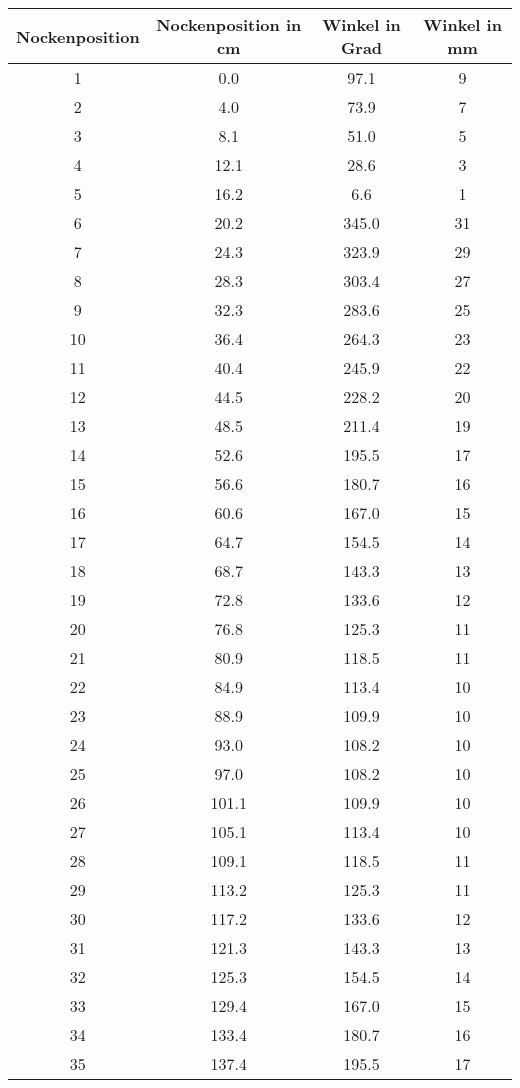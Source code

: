\documentclass[10pt, a4paper]{article}
\begin{document}
\begin{center}
	\begin{tabular}{c|c|c|c}
		Nockenposition & Nockenposition in cm & Winkel in Grad & Winkel in mm \\
		\hline
		1 & 0.0 & 97.1 & 9 \\
		2 & 4.0 & 73.9 & 7 \\
		3 & 8.1 & 51.0 & 5 \\
		4 & 12.1 & 28.6 & 3 \\
		5 & 16.2 & 6.6 & 1 \\
		6 & 20.2 & 345.0 & 31 \\
		7 & 24.3 & 323.9 & 29 \\
		8 & 28.3 & 303.4 & 27 \\
		9 & 32.3 & 283.6 & 25 \\
		10 & 36.4 & 264.3 & 23 \\
		11 & 40.4 & 245.9 & 22 \\
		12 & 44.5 & 228.2 & 20 \\
		13 & 48.5 & 211.4 & 19 \\
		14 & 52.6 & 195.5 & 17 \\
		15 & 56.6 & 180.7 & 16 \\
		16 & 60.6 & 167.0 & 15 \\
		17 & 64.7 & 154.5 & 14 \\
		18 & 68.7 & 143.3 & 13 \\
		19 & 72.8 & 133.6 & 12 \\
		20 & 76.8 & 125.3 & 11 \\
		21 & 80.9 & 118.5 & 11 \\
		22 & 84.9 & 113.4 & 10 \\
		23 & 88.9 & 109.9 & 10 \\
		24 & 93.0 & 108.2 & 10 \\
		25 & 97.0 & 108.2 & 10 \\
		26 & 101.1 & 109.9 & 10 \\
		27 & 105.1 & 113.4 & 10 \\
		28 & 109.1 & 118.5 & 11 \\
		29 & 113.2 & 125.3 & 11 \\
		30 & 117.2 & 133.6 & 12 \\
		31 & 121.3 & 143.3 & 13 \\
		32 & 125.3 & 154.5 & 14 \\
		33 & 129.4 & 167.0 & 15 \\
		34 & 133.4 & 180.7 & 16 \\
		35 & 137.4 & 195.5 & 17 \\

\end{tabular}
\end{center}
\end{document}
